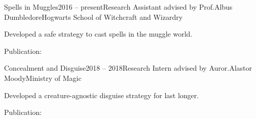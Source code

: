 \documentclass{tidycv} %
\begin{document}
\begin{cvpublications}
\begin{bibunit}[tidycv]
  \nocite{paper3}
\end{bibunit}
\end{cvpublications}

\begin{cvpublications}
\begin{bibunit}[tidycv]
  \nocite{paper2}
  \nocite{paper1}
\end{bibunit}
\end{cvpublications}

% 

\begin{cvresearches}
\begin{cvresearch}{Spells in Muggles}{2016 -- present}{Research Assistant advised by Prof.\@ Albus Dumbledore}{Hogwarts School of Witchcraft and Wizardry}
 \item Developed a safe strategy to cast spells in the muggle world.
 \item Publication: \cite{paper2,paper3}
\end{cvresearch}
\begin{cvresearch}{Concealment and Disguise}{2018 -- 2018}{Research Intern advised by Auror.\@ Alastor Moody}{Ministry of Magic}
 \item Developed a creature-agnostic disguise strategy for last longer.
 \item Publication: \cite{paper1}
\end{cvresearch}
\end{cvresearches}
\end{document}
